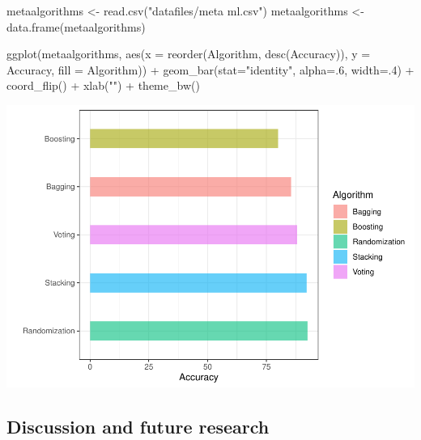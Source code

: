 \documentclass[
]{article}
\newenvironment{Shaded}{}{}
\newcommand{\AttributeTok}[1]{#1}
\newcommand{\DecValTok}[1]{#1}
\newcommand{\FunctionTok}[1]{#1}
\newcommand{\NormalTok}[1]{#1}
\newcommand{\OtherTok}[1]{\textcolor[rgb]{1.00,0.25,0.00}{#1}}
\newcommand{\SpecialCharTok}[1]{\textcolor[rgb]{0.00,0.50,0.50}{#1}}
\newcommand{\StringTok}[1]{\textcolor[rgb]{0.00,0.50,0.50}{#1}}
\begin{document}
\newpage

\begin{Shaded}
\begin{Highlighting}[]
\NormalTok{metaalgorithms }\OtherTok{\textless{}{-}} \FunctionTok{read.csv}\NormalTok{(}\StringTok{"datafiles/meta ml.csv"}\NormalTok{)}
\NormalTok{metaalgorithms }\OtherTok{\textless{}{-}} \FunctionTok{data.frame}\NormalTok{(metaalgorithms)}

\FunctionTok{ggplot}\NormalTok{(metaalgorithms, }\FunctionTok{aes}\NormalTok{(}\AttributeTok{x =} \FunctionTok{reorder}\NormalTok{(Algorithm, }\FunctionTok{desc}\NormalTok{(Accuracy)), }\AttributeTok{y =}\NormalTok{ Accuracy, }\AttributeTok{fill =}\NormalTok{ Algorithm)) }\SpecialCharTok{+}
  \FunctionTok{geom\_bar}\NormalTok{(}\AttributeTok{stat=}\StringTok{"identity"}\NormalTok{, }\AttributeTok{alpha=}\NormalTok{.}\DecValTok{6}\NormalTok{, }\AttributeTok{width=}\NormalTok{.}\DecValTok{4}\NormalTok{) }\SpecialCharTok{+}
  \FunctionTok{coord\_flip}\NormalTok{() }\SpecialCharTok{+}
  \FunctionTok{xlab}\NormalTok{(}\StringTok{""}\NormalTok{) }\SpecialCharTok{+}
  \FunctionTok{theme\_bw}\NormalTok{()}
\end{Highlighting}
\end{Shaded}

\begin{center}\includegraphics{Log_files/figure-latex/metalearners-1} \end{center}

\newpage

\hypertarget{discussion-and-future-research}{%
\subsection{Discussion and future
research}\label{discussion-and-future-research}}
\end{document}
